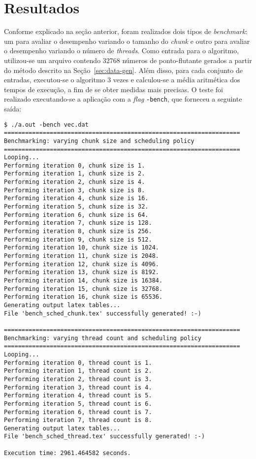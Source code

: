 \documentclass[12pt,a4paper]{article}
\begin{document}
\section{Resultados}
Conforme explicado na seção anterior, foram realizados dois tipos de
\textit{benchmark}: um para avaliar o desempenho variando o tamanho do
\textit{chunk} e outro para avaliar o desempenho variando o número de
\textit{threads}. Como entrada para o algoritmo, utilizou-se um arquivo contendo
32768 números de ponto-flutante gerados a partir do método descrito na
Seção~\ref{sec:data-gen}. Além disso, para cada conjunto de entradas,
executou-se o algoritmo 3 vezes e calculou-se a média aritmética dos tempos de
execução, a fim de se obter medidas mais precisas. O teste foi realizado
executando-se a aplicação com a \textit{flag} \texttt{-bench}, que forneceu a
seguinte saída:

\begin{verbatim}
$ ./a.out -bench vec.dat
===================================================================
Benchmarking: varying chunk size and scheduling policy
===================================================================
Looping...
Performing iteration 0, chunk size is 1.
Performing iteration 1, chunk size is 2.
Performing iteration 2, chunk size is 4.
Performing iteration 3, chunk size is 8.
Performing iteration 4, chunk size is 16.
Performing iteration 5, chunk size is 32.
Performing iteration 6, chunk size is 64.
Performing iteration 7, chunk size is 128.
Performing iteration 8, chunk size is 256.
Performing iteration 9, chunk size is 512.
Performing iteration 10, chunk size is 1024.
Performing iteration 11, chunk size is 2048.
Performing iteration 12, chunk size is 4096.
Performing iteration 13, chunk size is 8192.
Performing iteration 14, chunk size is 16384.
Performing iteration 15, chunk size is 32768.
Performing iteration 16, chunk size is 65536.
Generating output latex tables...
File 'bench_sched_chunk.tex' successfully generated! :-)

===================================================================
Benchmarking: varying thread count and scheduling policy
===================================================================
Looping...
Performing iteration 0, thread count is 1.
Performing iteration 1, thread count is 2.
Performing iteration 2, thread count is 3.
Performing iteration 3, thread count is 4.
Performing iteration 4, thread count is 5.
Performing iteration 5, thread count is 6.
Performing iteration 6, thread count is 7.
Performing iteration 7, thread count is 8.
Generating output latex tables...
File 'bench_sched_thread.tex' successfully generated! :-)

Execution time: 2961.464582 seconds.
\end{verbatim}
\end{document}
